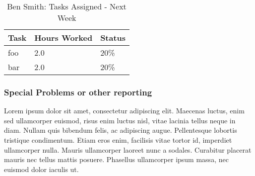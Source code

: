 \documentclass[12pt,article,compsoc]{IEEEtran}
\begin{document}
	\begin{table}[ht]
	\renewcommand{\arraystretch}{1.3}
		\caption{Ben Smith: Tasks Assigned - Next Week}
		
		\label{Summary of Ben Smith's activites: this week}
		
		\centering
		\begin{tabular}{p{5.5cm}|p{1cm}|p{1cm}}

		\hline
		\bfseries 	Task		 		& \bfseries Hours Worked	& \bfseries Status	\\
		\hline\hline
					foo					& 2.0						& 20\%				\\	%
					bar					& 2.0						& 20\%				\\	
		\hline
		\end{tabular}
	\end{table}

	\subsubsection*{Special Problems or other reporting}
	Lorem ipsum dolor sit amet, consectetur adipiscing elit. Maecenas luctus, enim sed ullamcorper euismod, risus enim luctus nisl, vitae lacinia tellus neque in diam. Nullam quis bibendum felis, ac adipiscing augue. Pellentesque lobortis tristique condimentum. Etiam eros enim, facilisis vitae tortor id, imperdiet ullamcorper nulla. Mauris ullamcorper laoreet nunc a sodales. Curabitur placerat mauris nec tellus mattis posuere. Phasellus ullamcorper ipsum massa, nec euismod dolor iaculis ut.
\end{document}
